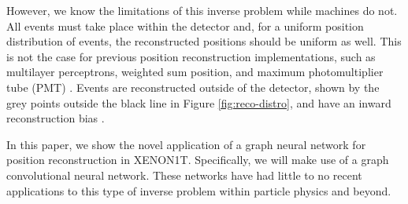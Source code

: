 \documentclass[thesis.tex]{subfiles}
\begin{document}
\par However, we know the limitations of this inverse problem while machines do not.
All events must take place within the detector and, for a uniform position distribution of events, the reconstructed positions should be uniform as well.
This is not the case for previous position reconstruction implementations, such as multilayer perceptrons, weighted sum position, and maximum photomultiplier tube (PMT) \cite{Bart}.
Events are reconstructed outside of the detector, shown by the grey points outside the black line in Figure \ref{fig:reco-distro}, and have an inward reconstruction bias \cite{Bart}.

\par In this paper, we show the novel application of a graph neural network for position reconstruction in XENON1T.
Specifically, we will make use of a graph convolutional neural network.
These networks have had little to no recent applications to this type of inverse problem within particle physics and beyond.
\end{document}

